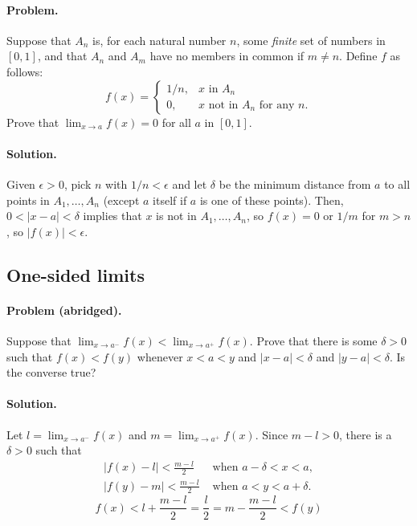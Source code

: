 \documentclass{article}
\begin{document}
\paragraph{Problem.} Suppose that $A_n$ is, for each natural number $n$, some
\emph{finite} set of numbers in $[0, 1]$, and that $A_n$ and $A_m$ have no
members in common if $m \neq n$. Define $f$ as follows: \begin{equation*}
  f(x) = \begin{cases}
    1/n, &x \text{ in } A_n \\
    0, &x \text{ not in } A_n \text{ for any } n.
  \end{cases}
\end{equation*} Prove that $\lim_{x \rightarrow a}f(x) = 0$ for all $a$ in $[0,
1]$.

\paragraph{Solution.} Given $\epsilon > 0$, pick $n$ with $1/n < \epsilon$ and
let $\delta$ be the minimum distance from $a$ to all points in $A_1, \ldots,
A_n$ (except $a$ itself if $a$ is one of these points). Then, $0 < |x - a| <
\delta$ implies that $x$ is not in $A_1, \ldots, A_n$, so $f(x) = 0$ or $1/m$
for $m > n$, so $|f(x)| < \epsilon$.

\setcounter{subsection}{30}
\subsection{One-sided limits}

\paragraph{Problem (abridged).} Suppose that $\lim_{x \rightarrow a^-}f(x) <
\lim_{x \rightarrow a^+}f(x)$. Prove that there is some $\delta > 0$ such that
$f(x) < f(y)$ whenever $x < a < y$ and $|x - a| < \delta$ and $|y - a| < \delta
$. Is the converse true?

\paragraph{Solution.} Let $l = \lim_{x \rightarrow a^-}f(x)$ and $m = \lim_{x
\rightarrow a^+}f(x)$. Since $m - l > 0$, there is a $\delta > 0$ such that
\begin{align*}
  |f(x) - l| < \frac{m - l}{2} &\text{ when } a - \delta < x < a, \\
  |f(y) - m| < \frac{m - l}{2} &\text{ when } a < y < a + \delta.
\end{align*}
\begin{equation*}
  f(x) < l + \frac{m - l}{2} = \frac{l}{2} = m - \frac{m - l}{2} < f(y)
\end{equation*}
\end{document}
